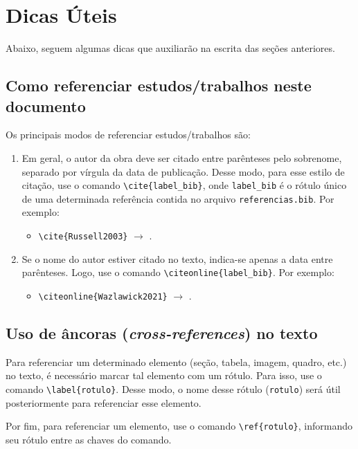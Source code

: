 \section{Dicas Úteis}

Abaixo, seguem algumas dicas que auxiliarão na escrita das seções anteriores.

\subsection{Como referenciar estudos/trabalhos neste documento}

Os principais modos de referenciar estudos/trabalhos são:
\begin{enumerate}[label=\roman*., itemsep=0pt, leftmargin=2.5cm]
    \item Em geral, o autor da obra deve ser citado entre parênteses pelo sobrenome, separado por vírgula da data de publicação. Desse modo, para esse estilo de citação, use o comando \verb|\cite{label_bib}|, onde \texttt{label\_bib} é o rótulo único de uma determinada referência contida no arquivo \texttt{referencias.bib}. Por exemplo:
        \begin{itemize}
            \item \verb|\cite{Russell2003}| $\rightarrow$ \cite{Russell2003}.
        \end{itemize}
    \item Se o nome do autor estiver citado no texto, indica-se apenas a data entre parênteses. Logo, use o comando \verb|\citeonline{label_bib}|. Por exemplo:
        \begin{itemize}
            \item \verb|\citeonline{Wazlawick2021}| $\rightarrow$ .
        \end{itemize}
\end{enumerate}

\subsection{Uso de âncoras (\textit{cross-references}) no texto}

Para referenciar um determinado elemento (seção, tabela, imagem, quadro, etc.) no texto, é necessário marcar tal elemento com um rótulo. Para isso, use o comando \verb|\label{rotulo}|. Desse modo, o nome desse rótulo (\texttt{rotulo}) será útil posteriormente para referenciar esse elemento.

Por fim, para referenciar um elemento, use o comando \verb|\ref{rotulo}|, informando seu rótulo entre as chaves do comando.

